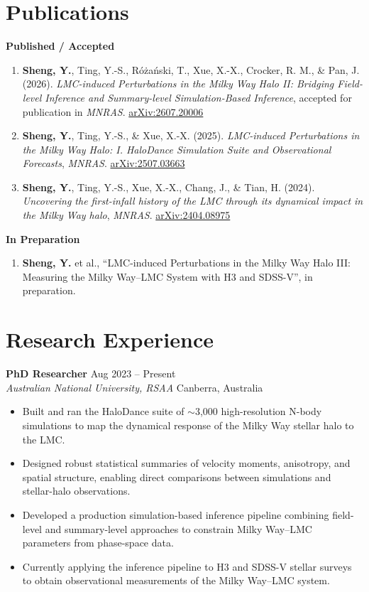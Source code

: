 \documentclass[11pt,a4paper]{article}
\newcommand{\cvsection}[1]{\Needspace{4\baselineskip}\section*{#1}}
\newcommand{\cventry}[4]{%
  \noindent\textbf{#1} \hfill #2 \\
  \textit{#3} \hfill #4 \par
}
\begin{document}
\cvsection{Publications}

\textbf{Published / Accepted}

\begin{enumerate}
    \item \textbf{Sheng, Y.}, Ting, Y.-S., R\'o\.za\'nski, T., Xue, X.-X., Crocker, R. M., \& Pan, J. (2026).
\textit{LMC-induced Perturbations in the Milky Way Halo II: Bridging Field-level Inference and Summary-level Simulation-Based Inference},
accepted for publication in \textit{MNRAS}. \href{https://arxiv.org/abs/2607.20006}{arXiv:2607.20006}
    \item \textbf{Sheng, Y.}, Ting, Y.-S., \& Xue, X.-X. (2025).
\textit{LMC-induced Perturbations in the Milky Way Halo: I. HaloDance Simulation Suite and Observational Forecasts},
\textit{MNRAS}. \href{https://arxiv.org/abs/2507.03663}{arXiv:2507.03663}
    \item \textbf{Sheng, Y.}, Ting, Y.-S., Xue, X.-X., Chang, J., \& Tian, H. (2024).
\textit{Uncovering the first-infall history of the LMC through its dynamical impact in the Milky Way halo},
\textit{MNRAS}. \href{https://arxiv.org/abs/2404.08975}{arXiv:2404.08975}
\end{enumerate}

\textbf{In Preparation}

\begin{enumerate}[resume]
    \item \textbf{Sheng, Y.} et al., ``LMC-induced Perturbations in the Milky Way Halo III: Measuring the Milky Way--LMC System with H3 and SDSS-V'', in preparation. 
\end{enumerate}

\newpage
\cvsection{Research Experience}

\cventry
  {PhD Researcher}
  {Aug 2023 -- Present}
  {Australian National University, RSAA}
  {Canberra, Australia}

\begin{itemize}
    \item Built and ran the HaloDance suite of $\sim$3,000 high-resolution N-body simulations to map the dynamical response of the Milky Way stellar halo to the LMC.
    \item Designed robust statistical summaries of velocity moments, anisotropy, and spatial structure, enabling direct comparisons between simulations and stellar-halo observations.
    \item Developed a production simulation-based inference pipeline combining field-level and summary-level approaches to constrain Milky Way--LMC parameters from phase-space data.
    \item Currently applying the inference pipeline to H3 and SDSS-V stellar surveys to obtain observational measurements of the Milky Way--LMC system.
\end{itemize}
\end{document}
